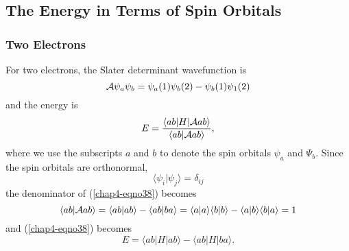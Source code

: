 {\subsection{The Energy in Terms of Spin Orbitals}

\subsubsection{Two Electrons}

For two electrons, the Slater determinant wavefunction is
\begin{equation}
{\cal A} \psi_a \psi_b = \psi_a (1) \psi_b (2) - \psi_b (1) \psi_1 (2)
\end{equation}
and the energy is
\begin{equation}
E = {\langle ab | H | {\cal A} ab \rangle \over \langle ab | {\cal 
A} ab \rangle} ,
\label{chap4-eqno38}
\end{equation}
where we use the subscripts $a$ and $b$ to denote the spin orbitals 
$\psi_a$ and $\Psi_b$.  Since the spin orbitals are orthonormal,
\begin{equation}
\langle \psi_i | \psi_j \rangle = \delta_{ij}
\label{chap4-eqno39}
\end{equation}
the denominator of (\ref{chap4-eqno38}) becomes
\begin{equation}
\langle ab | {\cal A} ab \rangle = \langle ab | ab \rangle - \langle ab | 
ba \rangle = \langle a | a \rangle \langle b | b \rangle - \langle a | b 
\rangle \langle b | a \rangle = 1
\end{equation}
and (\ref{chap4-eqno38}) becomes
\begin{equation}
E = \langle ab | H | ab \rangle - \langle ab | H | ba 
\rangle .
\label{chap4-eqno40}
\end{equation}

}
